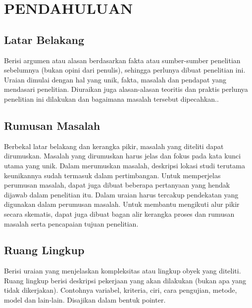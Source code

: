 
\chapter{PENDAHULUAN}

\section{Latar Belakang}
Berisi argumen atau alasan berdasarkan fakta atau sumber-sumber penelitian sebelumnya (bukan opini dari penulis), sehingga perlunya dibuat penelitian ini. Uraian dimulai dengan hal yang unik, fakta, masalah dan pendapat yang mendasari penelitian. Diuraikan juga alasan-alasan teoritis dan praktis perlunya penelitian ini dilakukan dan bagaimana masalah tersebut dipecahkan.\parencite{abdillahfudholi2024}.

\section{Rumusan Masalah}
Berbekal latar belakang dan kerangka pikir, masalah yang diteliti dapat dirumuskan. Masalah yang dirumuskan harus jelas dan fokus pada kata kunci utama yang unik. Dalam merumuskan masalah, deskripsi lokasi studi terutama keunikannya sudah termasuk dalam pertimbangan. Untuk memperjelas perumusan masalah, dapat juga dibuat beberapa pertanyaan yang hendak dijawab dalam penelitian itu. Dalam uraian harus tercakup pendekatan yang digunakan dalam perumusan masalah. Untuk membantu mengikuti alur pikir secara skematis, dapat juga dibuat bagan alir kerangka proses dan rumusan masalah serta pencapaian tujuan penelitian\parencite{adha2021}.


\section{Ruang Lingkup}
Berisi uraian yang menjelaskan kompleksitas atau lingkup obyek yang diteliti. Ruang lingkup berisi deskripsi pekerjaan yang akan dilakukan (bukan apa yang tidak dikerjakan). Contohnya variabel, kriteria, ciri, cara pengujian, metode, model dan lain-lain. Disajikan dalam bentuk pointer.


